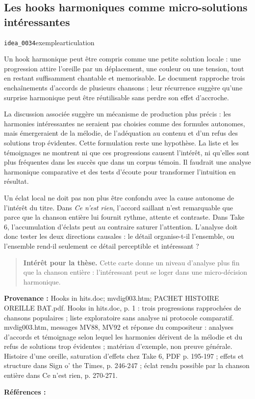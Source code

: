 \documentclass[10pt,a4paper]{article}
\begin{document}
\subsection{Les hooks harmoniques comme micro-solutions intéressantes}
{\small\color{metadata} \texttt{idea\_0034}\quad\textbullet\quad exemple\quad\textbullet\quad articulation\par}

Un hook harmonique peut être compris comme une petite solution locale : une progression attire l'oreille par un déplacement, une couleur ou une tension, tout en restant suffisamment chantable et memorisable. Le document rapproche trois enchaînements d'accords de plusieurs chansons ; leur récurrence suggère qu'une surprise harmonique peut être réutilisable sans perdre son effet d'accroche.

La discussion associée suggère un mécanisme de production plus précis : les harmonies intéressantes ne seraient pas choisies comme des formules autonomes, mais émergeraient de la mélodie, de l'adéquation au contenu et d'un refus des solutions trop évidentes. Cette formulation reste une hypothèse. La liste et les témoignages ne montrent ni que ces progressions causent l'intérêt, ni qu'elles sont plus fréquentes dans les succès que dans un corpus témoin. Il faudrait une analyse harmonique comparative et des tests d'écoute pour transformer l'intuition en résultat.

Un éclat local ne doit pas non plus être confondu avec la cause autonome de l'intérêt du titre. Dans \emph{Ce n'est rien}, l'accord saillant n'est remarquable que parce que la chanson entière lui fournit rythme, attente et contraste. Dans Take 6, l'accumulation d'éclats peut au contraire saturer l'attention. L'analyse doit donc tester les deux directions causales : le détail organise-t-il l'ensemble, ou l'ensemble rend-il seulement ce détail perceptible et intéressant ?

\begin{quote}
\textbf{Intérêt pour la thèse.} Cette carte donne un niveau d'analyse plus fin que la chanson entière : l'intéressant peut se loger dans une micro-décision harmonique.
\end{quote}
{\footnotesize\color{metadata}\textbf{Provenance :} Hooks in hits.doc; mvdig003.htm; PACHET HISTOIRE OREILLE BAT.pdf. Hooks in hits.doc, p. 1 : trois progressions rapprochées de chansons populaires ; liste exploratoire sans analyse ni protocole comparatif. mvdig003.htm, messages MV88, MV92 et réponse du compositeur : analyses d'accords et témoignage selon lequel les harmonies dérivent de la mélodie et du refus de solutions trop évidentes ; matériau d'exemple, non preuve générale. Histoire d'une oreille, saturation d'effets chez Take 6, PDF p. 195-197 ; effets et structure dans Sign o' the Times, p. 246-247 ; éclat rendu possible par la chanson entière dans Ce n'est rien, p. 270-271.\par}
{\footnotesize\color{metadata}\textbf{Références :} \parencite{pachet2018oreille}\par}
\end{document}
